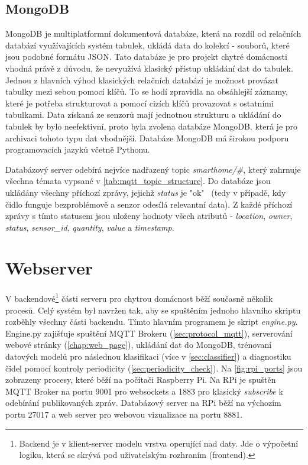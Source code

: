 \subsection*{MongoDB}
MongoDB \cite{MongoDB:online} je multiplatformní dokumentová databáze, která na rozdíl od relačních databází využívajících systém tabulek, ukládá data do kolekcí - souborů, které jsou podobné formátu JSON. Tato databáze je pro projekt chytré domácnosti vhodná právě z důvodu, že nevyužívá klasický přístup ukládání dat do tabulek. Jednou z hlavních výhod klasických relačních databází je možnost provázat tabulky mezi sebou pomocí klíčů. To se hodí zpravidla na obsáhlejší záznamy, které je potřeba strukturovat a pomocí cizích klíčů provazovat s ostatními tabulkami. Data získaná ze senzorů mají jednotnou strukturu a ukládání do tabulek by bylo neefektivní, proto byla zvolena databáze MongoDB, která je pro archivaci tohoto typu dat vhodnější. Databáze MongoDB má širokou podporu programovacích jazyků včetně Pythonu. \par
Databázový server odebírá nejvíce nadřazený topic \textit{smarthome/\#}, který zahrnuje všechna témata vypsané v \cref{tab:mqtt_topic_structure}. Do databáze jsou ukládány všechny příchozí zprávy, jejichž \textit{status} je "ok" \ (tedy v případě, kdy čidlo funguje bezproblémově a senzor odesílá relevantní data). Z každé příchozí zprávy s tímto statusem jsou uloženy hodnoty všech atributů - \textit{location}, \textit{owner}, \textit{status}, \textit{sensor\_id}, \textit{quantity}, \textit{value} a \textit{timestamp}. \par

\section{Webserver} \label{sec:webserver}

V backendové\footnote{Backend je v klient-server modelu vrstva operující nad daty. Jde o výpočetní logiku, která se skrývá pod uživatelským rozhraním (frontend).} části serveru pro chytrou domácnost běží současně několik procesů. Celý systém byl navržen tak, aby se spuštěním jednoho hlavního skriptu rozběhly všechny části backendu. Tímto hlavním programem je skript \textit{engine.py}. Engine.py zajišťuje spuštění MQTT Brokeru (\cref{sec:protocol_mqtt}), serverování webové stránky (\cref{chap:web_page}), ukládání dat do MongoDB, trénovaní datových modelů pro následnou klasifikaci (více v \cref{sec:classifier}) a diagnostiku čidel pomocí kontroly periodicity (\cref{sec:periodicity_check}).  Na \cref{fig:rpi_ports} jsou zobrazeny procesy, které běží na počítači Raspberry Pi. Na RPi je spuštěn MQTT Broker na portu 9001 pro websockets a 1883 pro klasický \textit{subscribe} k odebírání publikovaných zpráv. Databázový server na RPi běží na výchozím portu 27017 a web server pro webovou vizualizace na portu 8881. 

